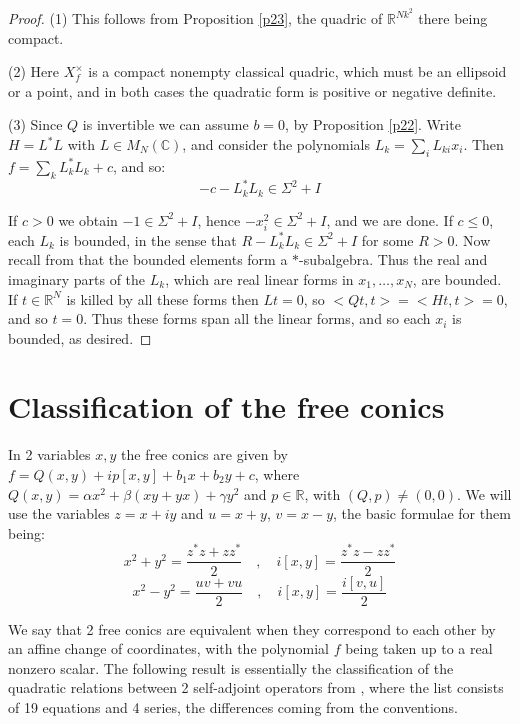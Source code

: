 \documentclass[11pt]{amsart}
\theoremstyle{definition}
\begin{document}
\begin{proof}
(1) This follows from Proposition \ref{p23}, the quadric of $\mathbb R^{Nk^2}$ there being compact.

(2) Here $X_f^\times$ is a compact nonempty classical quadric, which must be an ellipsoid or a point, and in both cases the quadratic form is positive or negative definite.

(3) Since $Q$ is invertible we can assume $b=0$, by Proposition \ref{p22}. Write $H=L^*L$ with $L\in M_N(\mathbb C)$, and consider the polynomials $L_k=\sum_iL_{ki}x_i$. Then $f=\sum_kL_k^*L_k+c$, and so:
$$-c-L_k^*L_k\in\Sigma^2+I$$

If $c>0$ we obtain $-1\in\Sigma^2+I$, hence $-x_i^2\in\Sigma^2+I$, and we are done. If $c\leq0$, each $L_k$ is bounded, in the sense that $R-L_k^*L_k\in\Sigma^2+I$ for some $R>0$. Now recall from \cite{cim} that the bounded elements form a $*$-subalgebra. Thus the real and imaginary parts of the $L_k$, which are real linear forms in $x_1,\ldots,x_N$, are bounded. If $t\in\mathbb R^N$ is killed by all these forms then $Lt=0$, so $<Qt,t>=<Ht,t>=0$, and so $t=0$. Thus these forms span all the linear forms, and so each $x_i$ is bounded, as desired.
\end{proof}

\section{Classification of the free conics}

In 2 variables $x,y$ the free conics are given by $f=Q(x,y)+ip[x,y]+b_1x+b_2y+c$, where $Q(x,y)=\alpha x^2+\beta(xy+yx)+\gamma y^2$ and $p\in\mathbb R$, with $(Q,p)\neq(0,0)$. We will use the variables $z=x+iy$ and $u=x+y$, $v=x-y$, the basic formulae for them being:
$$x^2+y^2=\frac{z^*z+zz^*}{2}\quad,\quad i[x,y]=\frac{z^*z-zz^*}{2}$$
$$x^2-y^2=\frac{uv+vu}{2}\quad,\quad i[x,y]=\frac{i[v,u]}{2}$$

We say that 2 free conics are equivalent when they correspond to each other by an affine change of coordinates, with the polynomial $f$ being taken up to a real nonzero scalar. The following result is essentially the classification of the quadratic relations between 2 self-adjoint operators from \cite{os1}, where the list consists of 19 equations and 4 series, the differences coming from the conventions.
\end{document}
